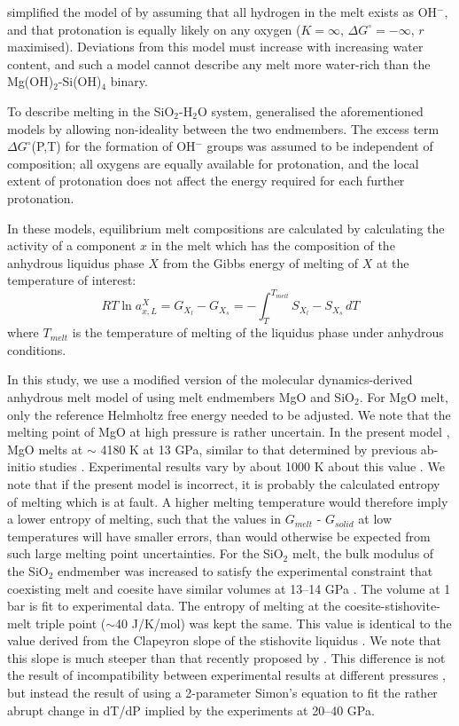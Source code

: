\documentclass[review]{elsarticle}
\begin{document}
\cite{THH2012} simplified the model of \cite{SS1985} by assuming that all hydrogen in the melt exists as OH$^-$, and that protonation is equally likely on any oxygen ($K=\infty$, $\Delta G^{\circ}=-\infty$, $r$ maximised). Deviations from this model must increase with increasing water content, and such a model cannot describe any melt more water-rich than the Mg(OH)$_2$-Si(OH)$_4$ binary. 

To describe melting in the SiO$_2$-H$_2$O system, \cite{HM2012} generalised the aforementioned models by allowing non-ideality between the two endmembers. The excess term $\Delta G^{\circ}$(P,T) for the formation of OH$^-$ groups was assumed to be independent of composition; all oxygens are equally available for protonation, and the local extent of protonation does not affect the energy required for each further protonation.

In these models, equilibrium melt compositions are calculated by calculating the activity of a component $x$ in the melt which has the composition of the anhydrous liquidus phase $X$ from the Gibbs energy of melting of $X$ at the temperature of interest:
\begin{equation}
RT \ln a_{x,L}^X = G_{X_l} - G_{X_{s}} = - \int_T^{T_{melt}} S_{X_{l}}-S_{X_s} \, dT
\end{equation}
where $T_{melt}$ is the temperature of melting of the liquidus phase under anhydrous conditions. 

In this study, we use a modified version of the molecular dynamics-derived anhydrous melt model of \cite{DKS2013} using melt endmembers MgO and SiO$_2$. For MgO melt, only the reference Helmholtz free energy needed to be adjusted. We note that the melting point of MgO at high pressure is rather uncertain. In the present model \citep{DKS2013}, MgO melts at $\sim$ 4180 K at 13 GPa, similar to that determined by previous ab-initio studies \citep{Alfe2005}. Experimental results vary by about 1000 K about this value \citep[3100 -- 5373 K at 13 GPa][]{ZB1994,ZF2008}. We note that if the present model is incorrect, it is probably the calculated entropy of melting which is at fault. A higher melting temperature would therefore imply a lower entropy of melting, such that the values in $G_{\textit{melt}}$ - $G_{\textit{solid}}$ at low temperatures will have smaller errors, than would otherwise be expected from such large melting point uncertainties. For the SiO$_2$ melt, the bulk modulus of the SiO$_2$ endmember was increased to satisfy the experimental constraint that coexisting melt and coesite have similar volumes at 13--14 GPa \citep{ZLGHF1993}. The volume at 1 bar is fit to experimental data. The entropy of melting at the coesite-stishovite-melt triple point ($\sim$40 J/K/mol) was kept the same. This value is identical to the value derived from the Clapeyron slope of the stishovite liquidus \cite{SL1995}. We note that this slope is much steeper than that recently proposed by \cite{Millotetal2015}. This difference is not the result of incompatibility between experimental results at different pressures \citep{SL1995, LAM1983, Millotetal2015}, but instead the result of using a 2-parameter Simon's equation to fit the rather abrupt change in dT/dP implied by the experiments at 20--40 GPa.
\end{document}
